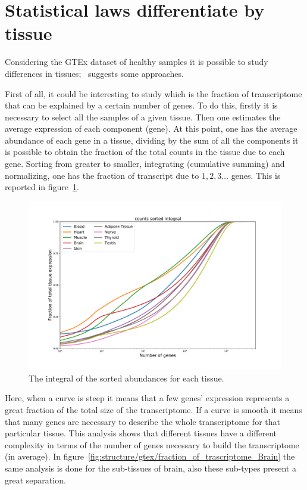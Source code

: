 \section{Statistical laws differentiate by tissue}
Considering the GTEx dataset of healthy samples it is possible to study differences in tissues;~\cite{mele2014} suggests some approaches.

First of all, it could be interesting to study which is the fraction of transcriptome that can be explained by a certain number of genes.
To do this, firstly it is necessary to select all the samples of a given tissue. Then one estimates the average expression of each component (gene). At this point, one has the average abundance of each gene in a tissue, dividing by the sum of all the components it is possible to obtain the fraction of the total counts in the tissue due to each gene. Sorting from greater to smaller, integrating (cumulative summing) and normalizing, one has the fraction of transcript due to $1, 2, 3\dots$ genes. This is reported in figure~\ref{fig:structure/gtex/fraction_of_trascriptome}.
\begin{figure}[htb!]
  \centering
  \includegraphics[width=0.9\linewidth]{pictures/structure/gtex/fraction_of_trascriptome.pdf}
  \caption{The integral of the sorted abundances for each tissue.}
  \label{fig:structure/gtex/fraction_of_trascriptome}
\end{figure}
\FloatBarrier
Here, when a curve is steep it means that a few genes' expression represents a great fraction of the total size of the transcriptome. If a curve is smooth it means that many genes are necessary to describe the whole transcriptome for that particular tissue. This analysis shows that different tissues have a different complexity in terms of the number of genes necessary to build the transcriptome (in average). In figure~\ref{fig:structure/gtex/fraction_of_trascriptome_Brain} the same analysis is done for the sub-tissues of brain, also these sub-types present a great separation.
